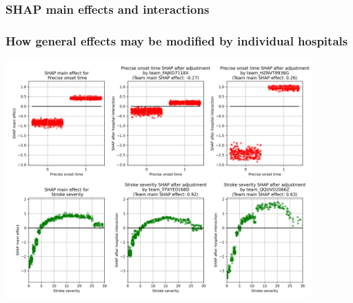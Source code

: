 \documentclass{beamer}
\begin{document}
\begin{frame}
\frametitle{SHAP main effects and interactions}


\end{frame}


\begin{frame}
\frametitle{How general effects may be modified by individual hospitals}

\begin{center}
\includegraphics[width=0.88\textwidth]{./images/12aa_two_way_shap_adjustment.jpg}
\end{center}
\end{frame}

\end{document}

